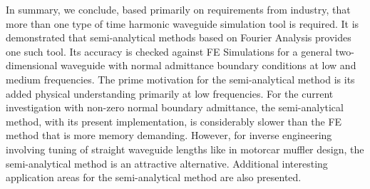 \documentclass[numreferences]{kluwer}
\begin{document}
In summary, we conclude, based primarily on requirements from industry, that more than one type of time harmonic waveguide simulation tool is required. It is demonstrated that semi-analytical methods based on Fourier Analysis provides one such tool. Its accuracy is checked against FE Simulations for a general two-dimensional waveguide with normal admittance boundary conditions at low and medium frequencies. The prime motivation for the semi-analytical method is its added physical understanding primarily at low frequencies. For the current investigation with non-zero normal boundary admittance, the semi-analytical method, with its present implementation, is considerably slower than the FE method that is more memory demanding. However, for inverse engineering involving tuning of straight waveguide lengths like in motorcar muffler design, the semi-analytical method is an attractive alternative. Additional interesting application areas for the semi-analytical method are also presented.







\end{document}
